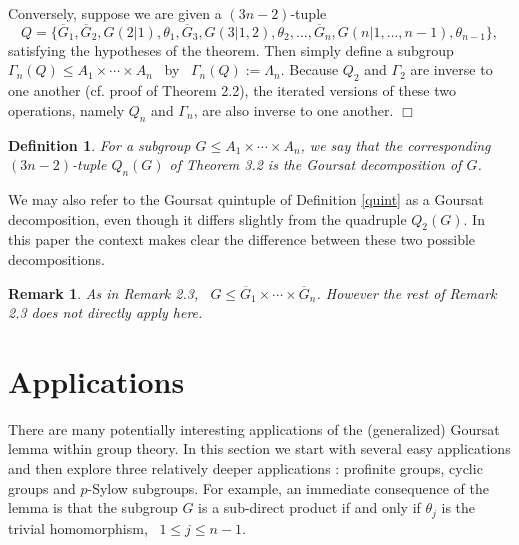 \documentclass[11pt]{article}
\theoremstyle{change}
\newtheorem{Rem}[Thm]{Remark}
\newtheorem{Def}[Thm]{Definition}
\newcommand{\<}{\langle}
\renewcommand{\>}{\rangle}
\begin{document}
Conversely, suppose we are given a $(3n-2)$-tuple
 $$Q =    \{\overline{G}_1,\overline{G}_2, G(2|1), \theta_1,\overline{G}_3, G(3|1,2), \theta_2 ,
\ldots, \overline{G}_n, G(n|1,\ldots ,n-1), \theta_{n-1}  \} , $$
satisfying the hypotheses of the theorem. Then simply define a subgroup \ $\Gamma_n(Q) \leq 
A_1\times \cdots\times A_n$ \ by \ $\Gamma_n(Q) := \Lambda_n$. Because $Q_2$ and $\Gamma_2$ are
inverse to one another (cf. proof of Theorem 2.2), the iterated versions of these two
operations, namely $Q_n$ and $\Gamma_n$, are also inverse to one another. \hfill $\Box$ 

 \begin{Def} For a subgroup $G\leq A_1\times \cdots \times A_n$, we say that the corresponding $(3n-2)$-tuple $Q_n(G)$ of Theorem 3.2 is the {\it Goursat decomposition} of $G$. \end{Def}

We may also refer to the Goursat quintuple of Definition \ref{quint} as a Goursat decomposition, even though it differs slightly from the quadruple $Q_2(G)$.  In this paper the context makes clear the difference between these two possible decompositions.

\begin{Rem}\label {3.3}
As in Remark 2.3, \ $G \leq \overline{G}_1\times \cdots \times \overline{G}_n$. However the rest
of Remark 2.3 does not directly apply here.




\end{Rem}

\mbox{}

\bigskip




















\section{Applications} \label{sec:4}
There are many potentially interesting applications of the (generalized) Goursat lemma within group theory. In this section we start with several
 easy applications and then explore three
relatively deeper applications :  profinite groups, 
cyclic groups and $p$-Sylow subgroups. For example, an immediate consequence of the lemma is that the subgroup $G$ is a sub-direct product if and only if $\theta_j$ is the trivial homomorphism, \ $1 \leq j \leq n-1$.  
\end{document}
